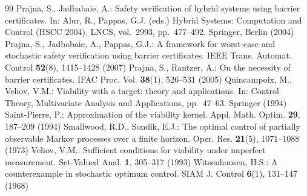 \begin{thebibliography}{99}
 Prajna, S., Jadbabaie, A.: Safety verification of hybrid systems using barrier certificates. In: Alur, R., Pappas, G.J. (eds.) Hybrid Systems: Computation and Control (HSCC 2004). LNCS, vol.~2993, pp.~477--492. Springer, Berlin (2004)
 Prajna, S., Jadbabaie, A., Pappas, G.J.: A framework for worst-case and stochastic safety verification using barrier certificates. IEEE Trans. Automat. Control \textbf{52}(8), 1415--1428 (2007)
 Prajna, S., Rantzer, A.: On the necessity of barrier certificates. IFAC Proc. Vol. \textbf{38}(1), 526--531 (2005)
 Quincampoix, M., Veliov, V.M.: Viability with a target: theory and applications. In: Control Theory, Multivariate Analysis and Applications, pp.~47--63. Springer (1994)
 Saint-Pierre, P.: Approximation of the viability kernel. Appl. Math. Optim. \textbf{29}, 187--209 (1994)
 Smallwood, R.D., Sondik, E.J.: The optimal control of partially observable Markov processes over a finite horizon. Oper. Res. \textbf{21}(5), 1071--1088 (1973)
 Veliov, V.M.: Sufficient conditions for viability under imperfect measurement. Set-Valued Anal. \textbf{1}, 305--317 (1993)
 Witsenhausen, H.S.: A counterexample in stochastic optimum control. SIAM J. Control \textbf{6}(1), 131--147 (1968)
\end{thebibliography}


